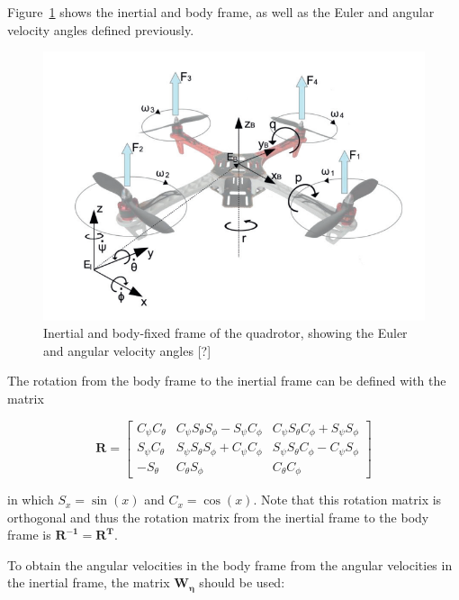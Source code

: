 \documentclass[letterpaper, 10 pt, conference]{ieeeconf}  %
\begin{document}

Figure~\ref{fig:quad_frame} shows the inertial and body frame, as well as the Euler and angular velocity angles defined previously.

\begin{figure}[!htpb]
	\centering
	\includegraphics[width=1.0\linewidth]{Images/quad_frame.png}
	\caption{Inertial and body-fixed frame of the quadrotor, showing the Euler and angular velocity angles [?] %
		}
	\label{fig:quad_frame}
\end{figure}


 The rotation from the body frame to the inertial frame can be defined with the matrix

$$\bm{R}=\left[ \begin{array}{ccc}{C_{\psi} C_{\theta}} & {C_{\psi} S_{\theta} S_{\phi}-S_{\psi} C_{\phi}} & {C_{\psi} S_{\theta} C_{\phi}+S_{\psi} S_{\phi}} \\ {S_{\psi} C_{\theta}} & {S_{\psi} S_{\theta} S_{\phi}+C_{\psi} C_{\phi}} & {S_{\psi} S_{\theta} C_{\phi}-C_{\psi} S_{\phi}} \\ {-S_{\theta}} & {C_{\theta} S_{\phi}} & {C_{\theta} C_{\phi}}\end{array}\right]$$

in which $S_{x}=\sin (x)$ and $C_{x}=\cos (x)$. Note that this rotation matrix is orthogonal and thus the rotation matrix from the inertial frame to the body frame is $\bm{R^{-1} = \bm{R^T}}$.

To obtain the angular velocities in the body frame from the angular velocities in the inertial frame, the matrix $\bm{W_\eta}$ should be used:
\end{document}
